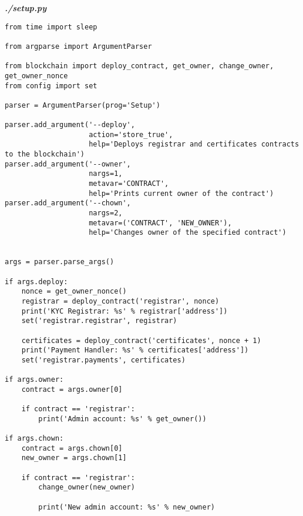 \textit{\textbf{./setup.py}}
\begin{verbatim}
from time import sleep

from argparse import ArgumentParser

from blockchain import deploy_contract, get_owner, change_owner, get_owner_nonce
from config import set

parser = ArgumentParser(prog='Setup')

parser.add_argument('--deploy',
                    action='store_true',
                    help='Deploys registrar and certificates contracts to the blockchain')
parser.add_argument('--owner',
                    nargs=1,
                    metavar='CONTRACT',
                    help='Prints current owner of the contract')
parser.add_argument('--chown',
                    nargs=2,
                    metavar=('CONTRACT', 'NEW_OWNER'),
                    help='Changes owner of the specified contract')


args = parser.parse_args()

if args.deploy:
    nonce = get_owner_nonce()
    registrar = deploy_contract('registrar', nonce)
    print('KYC Registrar: %s' % registrar['address'])
    set('registrar.registrar', registrar)

    certificates = deploy_contract('certificates', nonce + 1)
    print('Payment Handler: %s' % certificates['address'])
    set('registrar.payments', certificates)

if args.owner:
    contract = args.owner[0]

    if contract == 'registrar':
        print('Admin account: %s' % get_owner())

if args.chown:
    contract = args.chown[0]
    new_owner = args.chown[1]

    if contract == 'registrar':
        change_owner(new_owner)

        print('New admin account: %s' % new_owner)
\end{verbatim}

